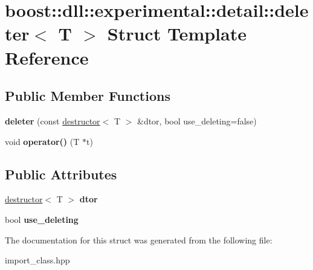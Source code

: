 \hypertarget{a00074}{}\section{boost\+:\+:dll\+:\+:experimental\+:\+:detail\+:\+:deleter$<$ T $>$ Struct Template Reference}
\label{a00074}
\subsection*{Public Member Functions}
\begin{DoxyCompactItemize}
\item 
{\bfseries deleter} (const \hyperlink{a00076}{destructor}$<$ T $>$ \&dtor, bool use\+\_\+deleting=false)\hypertarget{a00074_adccf6c423819a9ef6b7fe4dc568c2c7c}{}\label{a00074_adccf6c423819a9ef6b7fe4dc568c2c7c}

\item 
void {\bfseries operator()} (T $\ast$t)\hypertarget{a00074_af99da33db6b4418227c035f53098c85f}{}\label{a00074_af99da33db6b4418227c035f53098c85f}

\end{DoxyCompactItemize}
\subsection*{Public Attributes}
\begin{DoxyCompactItemize}
\item 
\hyperlink{a00076}{destructor}$<$ T $>$ {\bfseries dtor}\hypertarget{a00074_a586c2758249157c72ce2b71bb79e4efd}{}\label{a00074_a586c2758249157c72ce2b71bb79e4efd}

\item 
bool {\bfseries use\+\_\+deleting}\hypertarget{a00074_a1cb9ec367d2685a7a21947618468a5d9}{}\label{a00074_a1cb9ec367d2685a7a21947618468a5d9}

\end{DoxyCompactItemize}


The documentation for this struct was generated from the following file\+:\begin{DoxyCompactItemize}
\item 
import\+\_\+class.\+hpp\end{DoxyCompactItemize}
